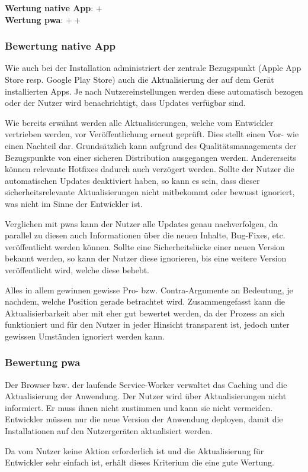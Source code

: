 \textbf{Wertung native App}: $+$ \\ 
\textbf{Wertung \ac{pwa}}: $++$ 

\subsubsection{Bewertung native App}
Wie auch bei der Installation administriert der zentrale Bezugspunkt (Apple App Store resp. Google Play Store) auch die Aktualisierung der auf dem Gerät installierten Apps. Je nach Nutzereinstellungen werden diese automatisch bezogen oder der Nutzer wird benachrichtigt, dass Updates verfügbar sind.

Wie bereits erwähnt werden alle Aktualisierungen, welche vom Entwickler vertrieben werden, vor Veröffentlichung erneut geprüft. Dies stellt einen Vor- wie einen Nachteil dar. Grundsätzlich kann aufgrund des Qualitätsmanagements der Bezugspunkte von einer sicheren Distribution ausgegangen werden. Andererseits können relevante Hotfixes dadurch auch verzögert werden. Sollte der Nutzer die automatischen Updates deaktiviert haben, so kann es sein, dass dieser sicherheitsrelevante Aktualisierungen nicht mitbekommt oder bewusst ignoriert, was nicht im Sinne der Entwickler ist.

Verglichen mit \acp{pwa} kann der Nutzer alle Updates genau nachverfolgen, da parallel zu diesen auch Informationen über die neuen Inhalte, Bug-Fixes, etc. veröffentlicht werden können. Sollte eine Sicherheitslücke einer neuen Version bekannt werden, so kann der Nutzer diese ignorieren, bis eine weitere Version veröffentlicht wird, welche diese behebt.

Alles in allem gewinnen gewisse Pro- bzw. Contra-Argumente an Bedeutung, je nachdem, welche Position gerade betrachtet wird. Zusammengefasst kann die Aktualisierbarkeit aber mit eher gut bewertet werden, da der Prozess an sich funktioniert und für den Nutzer in jeder Hinsicht transparent ist, jedoch unter gewissen Umständen ignoriert werden kann.

\subsubsection{Bewertung \ac{pwa}}
Der Browser bzw. der laufende Service-Worker verwaltet das Caching und die Aktualisierung der Anwendung. Der Nutzer wird über Aktualisierungen nicht informiert. Er muss ihnen nicht zustimmen und kann sie nicht vermeiden. Entwickler müssen nur die neue Version der Anwendung deployen, damit die Installationen auf den Nutzergeräten aktualisiert werden.

Da vom Nutzer keine Aktion erforderlich ist und die Aktualisierung für Entwickler sehr einfach ist, erhält dieses Kriterium die eine gute Wertung.